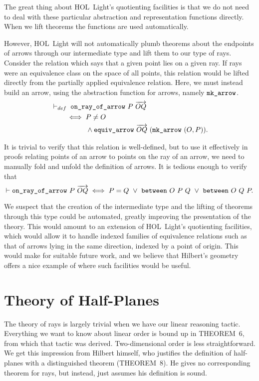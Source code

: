 The great thing about HOL~Light's quotienting facilities is that we do not need to deal with these particular abstraction and representation functions directly. When we lift theorems the functions are used automatically. 

However, HOL~Light will not automatically plumb theorems about the endpoints of arrows through our intermediate type and lift them to our type of rays. Consider the relation which says that a given point lies on a given ray. If rays were an equivalence class on the space of all points, this relation would be lifted directly from the partially applied equivalence relation. Here, we must instead build an arrow, using the abstraction function for arrows, namely $\texttt{mk\_arrow}$.
\begin{gather*}
  \begin{split}
    &\vdash_{def}\;\code{on\_ray\_of\_arrow}\ P\ \overrightarrow{OQ}\\
    &\qquad\iff P \neq O\\
    &\qquad\qquad\quad\wedge \code{equiv\_arrow}\ \overrightarrow{OQ}\ (\code{mk\_arrow}\ (O, P)).
  \end{split}
\end{gather*}

It is trivial to verify that this relation is well-defined, but to use it effectively in proofs relating points of an arrow to points on the ray of an arrow, we need to manually fold and unfold the definition of arrows. It is tedious enough to verify that
\begin{equation*}
  \vdash\code{on\_ray\_of\_arrow}\ P\ \overrightarrow{OQ} \iff P = Q\ \vee\ \between{O}{P}{Q}\ \vee\ \between{O}{Q}{P}.
\end{equation*}

We suspect that the creation of the intermediate  type and the lifting of theorems through this type could be automated, greatly improving the presentation of the theory. This would amount to an extension of HOL~Light's quotienting facilities, which would allow it to handle indexed families of equivalence relations such as that of arrows lying in the same direction, indexed by a point of origin. This would make for suitable future work, and we believe that Hilbert's geometry offers a nice example of where such facilities would be useful.

\section{Theory of Half-Planes}\label{sec:HalfPlaneTheory}
The theory of rays is largely trivial when we have our linear reasoning tactic. Everything we want to know about linear order is bound up in THEOREM~6, from which that tactic was derived. Two-dimensional order is less straightforward. We get this impression from Hilbert himself, who justifies the definition of half-planes with a distinguished theorem (THEOREM~8). He gives no corresponding theorem for rays, but instead, just assumes his definition is sound.

